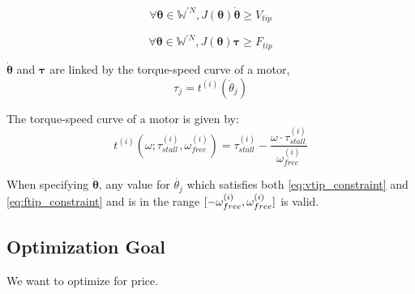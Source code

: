 \documentclass{article}
\begin{document}
\begin{equation}
    \forall \boldsymbol{\theta} \in \mathbb{W}^{\prime N}, J(\boldsymbol{\theta}) \boldsymbol{\dot{\theta}} \geq V_{tip}
    \label{eq:vtip_constraint}
\end{equation}

\begin{equation}
    \forall \boldsymbol{\theta} \in \mathbb{W}^{\prime N}, J(\boldsymbol{\theta}) \boldsymbol{\tau} \geq F_{tip}
    \label{eq:ftip_constraint}
\end{equation}

$\boldsymbol{\dot{{\theta}}}$ and $\boldsymbol{\tau}$ are linked by the torque-speed curve of a motor,
\begin{equation}
    \tau_j = t^{(i)}(\dot{\theta}_j)
\end{equation}

The torque-speed curve of a motor is given by:
\begin{equation}
    t^{(i)}(\omega; \tau_{stall}^{(i)}, \omega_{free}^{(i)}) = \tau_{stall}^{(i)} - \frac{\omega \cdot \tau_{stall}^{(i)}}{\omega_{free}^{(i)}}
\end{equation}

When specifying $\boldsymbol{\dot{\theta}}$, any value for $\dot{\theta_j}$
which satisfies both \ref{eq:vtip_constraint} and \ref{eq:ftip_constraint} and
is in the range $\interval{-\omega_{free}^{(i)}}{\omega_{free}^{(i)}}$ is
valid.

\FloatBarrier
\subsection{Optimization Goal}

We want to optimize for price.
\end{document}
